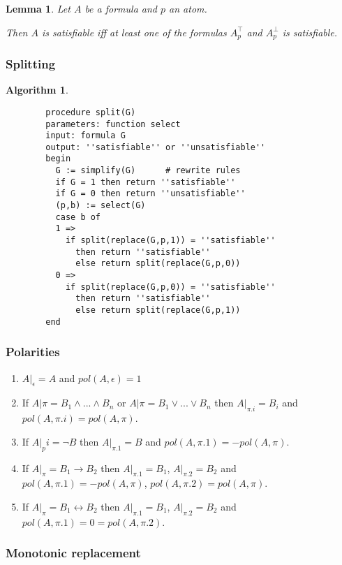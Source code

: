 \documentclass[]{article}
\newtheorem{lemma}{Lemma}
\newtheorem{algorithm}{Algorithm}
\begin{document}
\begin{lemma}
	Let $A$ be a formula and $p$ an atom.
	
	Then $A$ is satisfiable iff at least one of the formulas $A_p^\top$ and $A_p^\bot$ is satisfiable.
\end{lemma}

\subsubsection{Splitting}

\begin{algorithm}
	\begin{verbatim}
		procedure split(G)
		parameters: function select
		input: formula G
		output: ''satisfiable'' or ''unsatisfiable''
		begin
		  G := simplify(G)		# rewrite rules
		  if G = 1 then return ''satisfiable''
		  if G = 0 then return ''unsatisfiable''
		  (p,b) := select(G)
		  case b of
		  1 =>
		    if split(replace(G,p,1)) = ''satisfiable''
		      then return ''satisfiable''
		      else return split(replace(G,p,0))
		  0 =>
		    if split(replace(G,p,0)) = ''satisfiable''
		      then return ''satisfiable''
		      else return split(replace(G,p,1))
		end
	\end{verbatim}
\end{algorithm}

\subsubsection{Polarities}
\begin{enumerate}
	\item $A|_\epsilon = A$ and $pol(A,\epsilon) = 1$
	\item If $A|\pi = B_1 \land ... \land B_n$ or $A|\pi = B_1 \lor ... \lor B_n$ then $A|_{\pi.i} = B_i$ and $pol(A,\pi.i) = pol(A,\pi)$.
	\item If $A|_pi = \lnot B$ then $A|_{\pi.1} = B$ and $pol(A,\pi.1) = -pol(A,\pi)$.
	\item If $A|_\pi = B_1 \rightarrow B_2$ then $A|_{\pi.1} = B_1$, $A|_{\pi.2} = B_2$ and $pol(A,\pi.1) = -pol(A,\pi)$, $pol(A,\pi.2) = pol(A,\pi)$.
	\item If $A|_\pi = B_1 \leftrightarrow B_2$ then $A|_{\pi.1} = B_1$, $A|_{\pi.2} = B_2$ and $pol(A,\pi.1) = 0 = pol(A,\pi.2)$.
\end{enumerate}

\subsubsection{Monotonic replacement}
\end{document}
